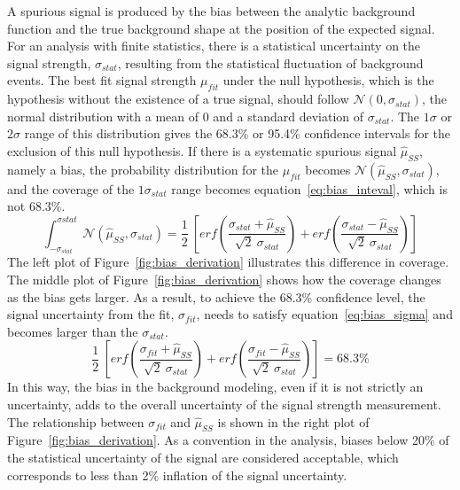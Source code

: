 A spurious signal is produced by the bias between the analytic background function and the true background shape at the position of the expected signal.
For an analysis with finite statistics, there is a statistical uncertainty on the signal strength, $\sigma_{stat}$,
resulting from the statistical fluctuation of background events.
The best fit signal strength $\mu_{fit}$ under the null hypothesis, which is the hypothesis without the existence of a true signal,
should follow $\mathcal{N}(0, \sigma_{stat})$, the normal distribution with a mean of 0 and a standard deviation of $\sigma_{stat}$.
The $1\sigma$ or $2\sigma$ range of this distribution gives the 68.3\% or 95.4\% confidence intervals for the exclusion of this null hypothesis.
If there is a systematic spurious signal $\hat{\mu}_{SS}$, namely a bias, the probability distribution for the $\mu_{fit}$ becomes $\mathcal{N}(\hat{\mu}_{SS}, \sigma_{stat})$,
and the coverage of the $1\sigma_{stat}$ range becomes equation~\ref{eq:bias_inteval}, which is not 68.3\%.
\begin{equation}\label{eq:bias_inteval}
  \int_{-\sigma_{stat}}^{\sigma{stat}} \mathcal{N}(\hat{\mu}_{SS}, \sigma_{stat}) = \frac{1}{2} ~[erf(\frac{\sigma_{stat}+\hat{\mu}_{SS}}{\sqrt{2}~\sigma_{stat}}) + erf(\frac{\sigma_{stat}-\hat{\mu}_{SS}}{\sqrt{2}~\sigma_{stat}})]
\end{equation}
The left plot of Figure~\ref{fig:bias_derivation} illustrates this difference in coverage.
The middle plot of Figure~\ref{fig:bias_derivation} shows how the coverage changes as the bias gets larger.  
As a result, to achieve the 68.3\% confidence level, the signal uncertainty from the fit, $\sigma_{fit}$, 
needs to satisfy equation~\ref{eq:bias_sigma} and becomes larger than the $\sigma_{stat}$. 
\begin{equation}\label{eq:bias_sigma}
  \frac{1}{2} ~[erf(\frac{\sigma_{fit}+\hat{\mu}_{SS}}{\sqrt{2}~\sigma_{stat}}) + erf(\frac{\sigma_{fit}-\hat{\mu}_{SS}}{\sqrt{2}~\sigma_{stat}})] = 68.3\%
\end{equation}
In this way, the bias in the background modeling, even if it is not strictly an uncertainty, 
adds to the overall uncertainty of the signal strength measurement.
The relationship between $\sigma_{fit}$ and $\hat{\mu}_{SS}$ is shown in the right plot of Figure~\ref{fig:bias_derivation}.
As a convention in the \hmm analysis, biases below 20\% of the statistical uncertainty of the signal are considered acceptable,
which corresponds to less than 2\% inflation of the signal uncertainty.

